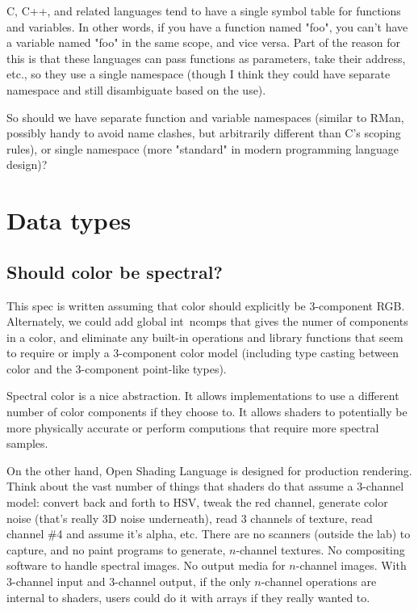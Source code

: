 \documentclass[11pt,letterpaper]{book}
\def\langname{Open Shading Language\xspace}
\def\color{{\cf color}\xspace}
\def\inttype{{\cf int}\xspace}
\def\point{{\cf point}\xspace}
\begin{document}
\begin{annotate}
C, C++, and related languages tend to have a single symbol table for
functions and variables. In other words, if you have a function named
"foo", you can't have a variable named "foo" in the same scope, and vice
versa. Part of the reason for this is that these languages can pass
functions as parameters, take their address, etc., so they use a single
namespace (though I think they could have separate namespace and still
disambiguate based on the use).

So should we have separate function and variable namespaces (similar
to RMan, possibly handy to avoid name clashes, but arbitrarily different
than C's scoping rules), or single namespace (more "standard" in modern
programming language design)?

\section{Data types}

\subsection{Should \color be spectral?}

This spec is written assuming that \color should explicitly be
3-component RGB.  Alternately, we could add global \inttype\ {\cf ncomps} that gives the
numer of components in a \color, and eliminate any built-in operations
and library functions that seem to require or imply a 3-component color
model (including type casting between \color and the 3-component
\point-like types).

Spectral color is a nice abstraction.  It allows implementations to use
a different number of color components if they choose to.  It allows
shaders to potentially be more physically accurate or perform computions
that require more spectral samples.

On the other hand, \langname is designed for production rendering.
Think about the vast number of things that shaders do that assume a
3-channel model: convert back and forth to HSV, tweak the red channel,
generate {\cf color noise} (that's really 3D noise underneath), read 3
channels of texture, read channel \#4 and assume it's alpha, etc.  There
are no scanners (outside the lab) to capture, and no paint programs to
generate, $n$-channel textures.  No compositing software to handle
spectral images.  No output media for $n$-channel images.  With
3-channel input and 3-channel output, if the only $n$-channel operations
are internal to shaders, users could do it with arrays if they really
wanted to.


\end{annotate}
\end{document}
